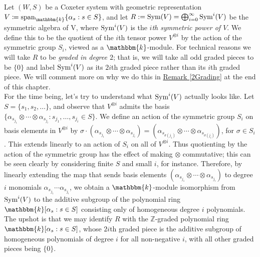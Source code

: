 \noindent Let $(W, S)$ be a Coxeter system with geometric representation $V \coloneqq \textup{span}_\mathbbm{k}\{\alpha_s : s \in S\}$, and let $R := \textup{Sym}(V) = \bigoplus_{i=0}^\infty \textup{Sym}^i(V)$ 
be the symmetric algebra of V, where $\textup{Sym}^i(V)$ is the {\em $i$th symmetric power of $V$}. We define this to be the quotient of the $i$th tensor power $V^{\otimes i}$ by the action of the symmetric group $S_i$, viewed as a $\mathbbm{k}$-module. For technical reasons we will take $R$ to be {\em graded in degree $2$}; that is, we will take all odd graded pieces to be $\{0\}$ and label $\textup{Sym}^i(V)$ as its $2i$th graded piece rather than its $i$th graded piece. We will comment more on why we do this in \hyperref[2Grading]{Remark \ref*{2Grading}} at the end of this chapter.\\

\noindent For the time being, let's try to understand what $\textup{Sym}^i(V)$ actually looks like. Let $S = \{s_1, s_2, \dots\}$, and observe that $V^{\otimes i}$ admits the basis $\{\alpha_{s_{j_1}} \otimes \cdots \otimes \alpha_{s_{j_i}} : s_{j_1}, \dots, s_{j_i} \in S\}$. We define an action of the symmetric group $S_i$ on basis elements in $V^{\otimes i}$ by $\sigma \cdot (\alpha_{s_{j_1}} \otimes \cdots \otimes \alpha_{s_{j_i}}) = (\alpha_{s_{\sigma(j_1)}} \otimes \cdots \otimes \alpha_{s_{\sigma(j_i)}})$, for $\sigma \in S_i$. This extends linearly to an action of $S_i$ on all of $V^{\otimes i}$. Thus quotienting by the action of the symmetric group has the effect of making $\otimes$ commutative; this can be seen clearly by considering finite $S$ and small $i$, for instance. Therefore, by linearly extending the map that sends basis elements $(\alpha_{s_{j_1}} \otimes \cdots \otimes \alpha_{s_{j_i}})$ to degree $i$ monomials $\alpha_{s_{j_1}} \cdots \alpha_{s_{j_i}}$, we obtain a $\mathbbm{k}$-module isomorphism from $\textup{Sym}^i(V)$ to the additive subgroup of the polynomial ring $\mathbbm{k}[\alpha_s : s \in S]$ consisting only of homogeneous degree $i$ polynomials. The upshot is that we may identify $R$ with the $\mathbb{Z}$-graded polynomial ring $\mathbbm{k}[\alpha_s : s \in S]$, whose $2i$th graded piece is the additive subgroup of homogeneous polynomials of degree $i$ for all non-negative $i$, with all other graded pieces being $\{0\}$.\newpage%

